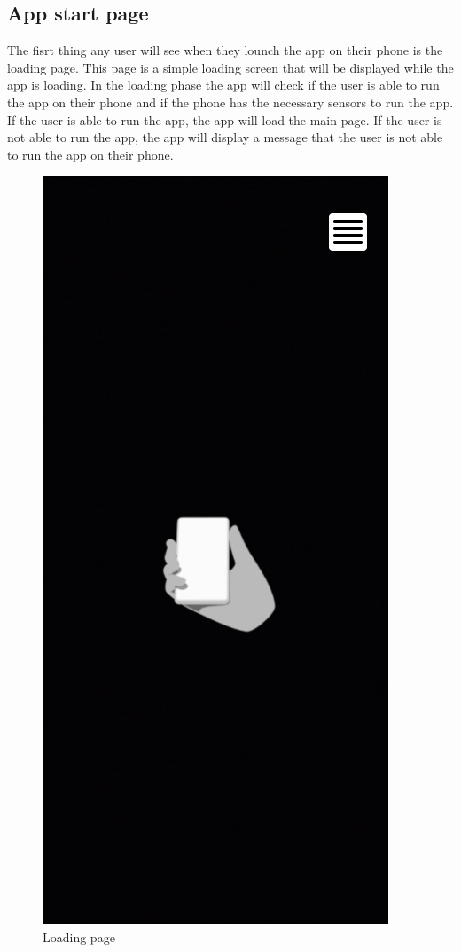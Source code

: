 \subsection{App start page}
The fisrt thing any user will see when they lounch the app on their phone is the loading page. This page is a simple loading screen that will be displayed while the app is loading. In the loading phase the app will check if the user is able to run the app on their phone and if the phone has the necessary sensors to run the app. If the user is able to run the app, the app will load the main page. If the user is not able to run the app, the app will display a message that the user is not able to run the app on their phone.
\begin{figure}[h!]
    \begin{center}
        \includegraphics[scale=0.5]{img/App_mock/iPhone 14 - 1.png}
        \caption{Loading page}
        \label{fig:loading-page}
    \end{center}
\end{figure}
\pagebreak


